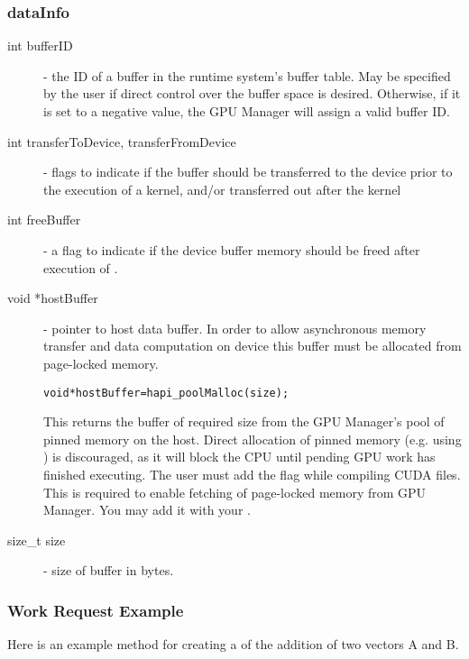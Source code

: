 \documentclass[10pt]{report}
\begin{document}
\subsubsection{dataInfo}
\begin{description}
\item[int bufferID]- the ID of a buffer in the runtime system's buffer table.
May be specified by the user if direct control over the buffer space is
desired. Otherwise, if it is set to a negative value, the GPU Manager will
assign a valid buffer ID.

\item[int transferToDevice, transferFromDevice]- flags to indicate if the buffer
should be transferred to the device prior to the execution of a kernel, and/or
transferred out after the kernel

\item[int freeBuffer]- a flag to indicate if the device buffer memory should be
freed after execution of .

\item[void *hostBuffer]- pointer to host data buffer. In order to allow
asynchronous memory transfer and data computation on device this buffer must
be allocated from page-locked memory.
\begin{alltt}
void *hostBuffer = hapi\_poolMalloc(size);
\end{alltt}
This returns the buffer of required size from the GPU Manager's pool of pinned memory on the host.
Direct allocation of pinned memory (e.g. using ) is discouraged,
as it will block the CPU until pending GPU work has finished executing.
The user must add the  flag while compiling CUDA files.
This is required to enable fetching of page-locked memory from GPU Manager.
You may add it with your .

\item[size\_t size]- size of buffer in bytes.
\end{description}

\subsubsection{Work Request Example}

Here is an example method for creating a  of the addition of
two vectors A and B.
\end{document}
